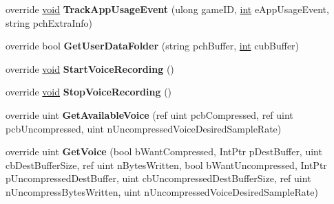 \begin{DoxyCompactItemize}
\item 
\hypertarget{classValve_1_1Steamworks_1_1CSteamUser_a2441ca19321274e6f4b2b08ca010687c}{}override \hyperlink{SDL__audio_8h_a52835ae37c4bb905b903cbaf5d04b05f}{void} {\bfseries Track\+App\+Usage\+Event} (ulong game\+I\+D, \hyperlink{SDL__thread_8h_a6a64f9be4433e4de6e2f2f548cf3c08e}{int} e\+App\+Usage\+Event, string pch\+Extra\+Info)\label{classValve_1_1Steamworks_1_1CSteamUser_a2441ca19321274e6f4b2b08ca010687c}

\item 
\hypertarget{classValve_1_1Steamworks_1_1CSteamUser_a662b9e336f3ac5ba1432de76e1defc72}{}override bool {\bfseries Get\+User\+Data\+Folder} (string pch\+Buffer, \hyperlink{SDL__thread_8h_a6a64f9be4433e4de6e2f2f548cf3c08e}{int} cub\+Buffer)\label{classValve_1_1Steamworks_1_1CSteamUser_a662b9e336f3ac5ba1432de76e1defc72}

\item 
\hypertarget{classValve_1_1Steamworks_1_1CSteamUser_a317a656c6f517478ad5e8b8849e9451f}{}override \hyperlink{SDL__audio_8h_a52835ae37c4bb905b903cbaf5d04b05f}{void} {\bfseries Start\+Voice\+Recording} ()\label{classValve_1_1Steamworks_1_1CSteamUser_a317a656c6f517478ad5e8b8849e9451f}

\item 
\hypertarget{classValve_1_1Steamworks_1_1CSteamUser_aaaa40d7ed3e5782685fa82e65aa7349a}{}override \hyperlink{SDL__audio_8h_a52835ae37c4bb905b903cbaf5d04b05f}{void} {\bfseries Stop\+Voice\+Recording} ()\label{classValve_1_1Steamworks_1_1CSteamUser_aaaa40d7ed3e5782685fa82e65aa7349a}

\item 
\hypertarget{classValve_1_1Steamworks_1_1CSteamUser_a354913b9db7f72fb8c5013e8c9defefa}{}override uint {\bfseries Get\+Available\+Voice} (ref uint pcb\+Compressed, ref uint pcb\+Uncompressed, uint n\+Uncompressed\+Voice\+Desired\+Sample\+Rate)\label{classValve_1_1Steamworks_1_1CSteamUser_a354913b9db7f72fb8c5013e8c9defefa}

\item 
\hypertarget{classValve_1_1Steamworks_1_1CSteamUser_af156744de0ab9cf14f8c595a4576bd4c}{}override uint {\bfseries Get\+Voice} (bool b\+Want\+Compressed, Int\+Ptr p\+Dest\+Buffer, uint cb\+Dest\+Buffer\+Size, ref uint n\+Bytes\+Written, bool b\+Want\+Uncompressed, Int\+Ptr p\+Uncompressed\+Dest\+Buffer, uint cb\+Uncompressed\+Dest\+Buffer\+Size, ref uint n\+Uncompress\+Bytes\+Written, uint n\+Uncompressed\+Voice\+Desired\+Sample\+Rate)\label{classValve_1_1Steamworks_1_1CSteamUser_af156744de0ab9cf14f8c595a4576bd4c}


\end{DoxyCompactItemize}
